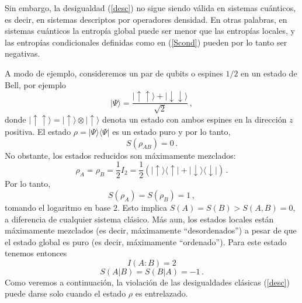 Sin embargo, la desigualdad (\ref{desc}) no sigue siendo válida en sistemas cuánticos, es decir, en sistemas descriptos por operadores densidad. En otras palabras, en sistemas cuánticos la entropía global puede ser menor que las entropías locales, y las entropías condicionales definidas como en (\ref{Scond}) pueden por lo tanto ser negativas. 


A modo de ejemplo, consideremos un par de qubits o espines $1/2$
en un estado de Bell, por ejemplo
\begin{equation}|\Psi\rangle=\frac{|\!\!\uparrow\uparrow\rangle+
|\!\!\downarrow\downarrow\rangle}{\sqrt{2}}
 \label{bell1}\,,\end{equation}
donde $|\!\!\uparrow\uparrow\rangle=|\!\!\uparrow\rangle\otimes|\!\!\uparrow\rangle$
denota un estado con ambos espines en la dirección $z$ positiva. 
El estado $\rho=|\Psi\rangle\langle\Psi|$ es un estado puro y por lo tanto, 
\[S(\rho_{AB})=0\,.\] 
No obstante, los estados reducidos son máximamente mezclados: 
\[\rho_A=\rho_B=\frac{1}{2}I_2=\frac{1}{2}(|\uparrow\rangle\langle \uparrow|+|\downarrow\rangle\langle \downarrow|)\,.\]
Por lo tanto,
\begin{equation}
S(\rho_A)=S(\rho_B)=1\,,\end{equation}
tomando el logaritmo en base $2$.  Esto implica $S(A)=S(B)>S(A,B)=0$, a diferencia de cualquier sistema clásico. M\'as aun, los estados locales están máximamente mezclados (es decir, máximamente ``desordenados'') a pesar de  que el estado global es puro (es decir, máximamente ``ordenado''). Para este estado tenemos entonces 
\[I(A:B)=2\]
\[S(A|B)=S(B|A)=-1\,.\]
Como veremos a continuación, la violación de las desigualdades clásicas (\ref{desc}) puede darse solo cuando el estado $\rho$ es entrelazado. 



